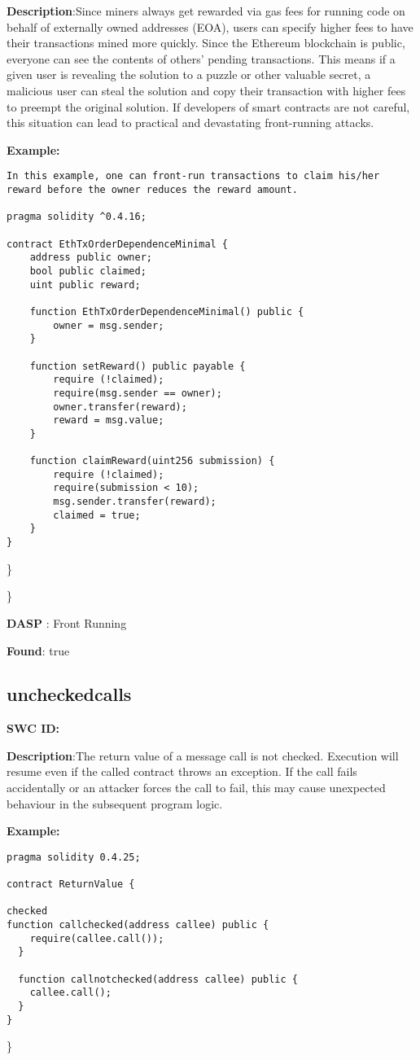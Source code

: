 \documentclass{article}
\begin{document}
\textbf{Description}:Since miners always get rewarded via gas fees for running code on behalf of externally owned addresses (EOA), users can specify higher fees to have their transactions mined more quickly. Since the Ethereum blockchain is public, everyone can see the contents of others' pending transactions. This means if a given user is revealing the solution to a puzzle or other valuable secret, a malicious user can steal the solution and copy their transaction with higher fees to preempt the original solution. If developers of smart contracts are not careful, this situation can lead to practical and devastating front-running attacks.


\textbf{Example:} 
\begin{verbatim}
In this example, one can front-run transactions to claim his/her reward before the owner reduces the reward amount.

pragma solidity ^0.4.16;

contract EthTxOrderDependenceMinimal {
    address public owner;
    bool public claimed;
    uint public reward;

    function EthTxOrderDependenceMinimal() public {
        owner = msg.sender;
    }

    function setReward() public payable {
        require (!claimed);
        require(msg.sender == owner);
        owner.transfer(reward);
        reward = msg.value;
    }

    function claimReward(uint256 submission) {
        require (!claimed);
        require(submission < 10);
        msg.sender.transfer(reward);
        claimed = true;
    }
}

\end{verbatim}\} 

\} 

\textbf{DASP} : Front Running

\textbf{Found}: true

\subsection{unchecked\textunderscore calls} 
\textbf{SWC \textunderscore ID:} 

\textbf{Description}:The return value of a message call is not checked. Execution will resume even if the called contract throws an exception. If the call fails accidentally or an attacker forces the call to fail, this may cause unexpected behaviour in the subsequent program logic.


\textbf{Example:} 
\begin{verbatim}
pragma solidity 0.4.25;

contract ReturnValue {

checked
function callchecked(address callee) public {
    require(callee.call());
  }

  function callnotchecked(address callee) public {
    callee.call();
  }
}

\end{verbatim}\} 
\end{document}
